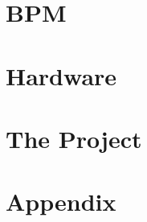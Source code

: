 \documentclass{report}
\begin{document}
    \part{BPM}
    

    \part{Hardware}
    

    \part{The Project}
    
    
    \part{Appendix}
    
\end{document}
